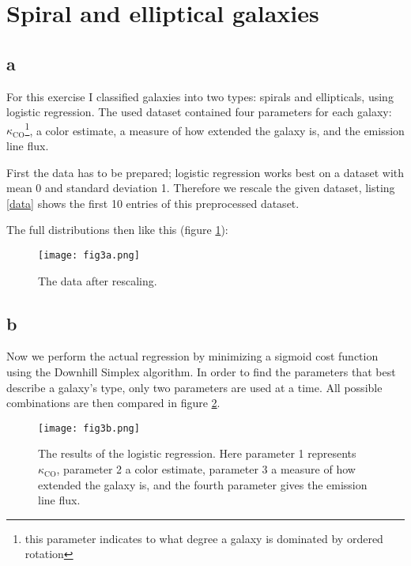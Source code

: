 \section{Spiral and elliptical galaxies}


\subsection*{a}
For this exercise I classified galaxies into two types: spirals and ellipticals, using logistic regression.
The used dataset contained four parameters for each galaxy: $\kappa_{\text{CO}}$\footnote{this parameter indicates to what degree a galaxy is dominated by ordered rotation}, a color estimate, a measure of how extended the galaxy is, and the emission line flux.

First the data has to be prepared; logistic regression works best on a dataset with mean 0 and standard deviation 1.
Therefore we rescale the given dataset, listing \ref{data} shows the first 10 entries of this preprocessed dataset.


The full distributions then like this (figure \ref{fig:rescaled_data}):
\begin{figure}
    \centering
    \texttt{[image: fig3a.png]}
    \caption{The data after rescaling.}
    \label{fig:rescaled_data}
\end{figure}





\subsection*{b}
Now we perform the actual regression by minimizing a sigmoid cost function using the Downhill Simplex algorithm.
In order to find the parameters that best describe a galaxy's type, only two parameters are used at a time.
All possible combinations are then compared in figure \ref{fig:logistic_regression}.

\begin{figure}
    \centering
    \texttt{[image: fig3b.png]}
    \caption{The results of the logistic regression. Here parameter 1 represents $\kappa_{\text{CO}}$, parameter 2 a color estimate, parameter 3 a measure of how extended the galaxy is, and the fourth parameter gives the emission line flux.}
    \label{fig:logistic_regression}
\end{figure}

